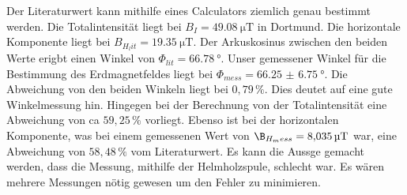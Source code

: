 Der Literaturwert \cite{3} kann mithilfe eines Calculators ziemlich genau bestimmt werden.
Die Totalintensität liegt bei $B_I =\SI{49,08}{\micro\tesla}$ in Dortmund.
Die horizontale Komponente liegt bei $B_{H_lit} = \SI{19.35}{\micro\tesla}$.
Der Arkuskosinus zwischen den beiden Werte erigbt einen Winkel von $\Phi_{lit} = \SI{66,78}{\degree}$.
Unser gemessener Winkel für die Bestimmung des Erdmagnetfeldes liegt bei $\Phi_{mess} = \SI{66.25(675)}{\degree}$.
Die Abweichung von den beiden Winkeln liegt bei $0,79 \, \%$. Dies deutet auf eine gute Winkelmessung hin.
Hingegen bei der Berechnung von der Totalintensität eine Abweichung von ca $59,25 \,\%$ vorliegt.
Ebenso ist bei der horizontalen Komponente, was bei einem gemessenen Wert von $\B_{H_mess} =\SI{8.035}{\micro\tesla}$ war,
eine Abweichung von $58,48 \,\%$ vom Literaturwert.
Es kann die Aussge gemacht werden, dass die Messung, mithilfe der Helmholzspule, schlecht war. Es wären mehrere Messungen
nötig gewesen um den Fehler zu minimieren.  
